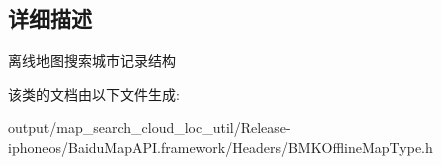 \subsection{详细描述}
离线地图搜索城市记录结构 

该类的文档由以下文件生成\+:\begin{DoxyCompactItemize}
\item 
output/map\+\_\+search\+\_\+cloud\+\_\+loc\+\_\+util/\+Release-\/iphoneos/\+Baidu\+Map\+A\+P\+I.\+framework/\+Headers/B\+M\+K\+Offline\+Map\+Type.\+h\end{DoxyCompactItemize}
